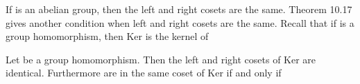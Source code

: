 \documentclass[11pt,oneside]{article}
\begin{document}
\begin{BookBody}
If  is an abelian group, then the left and right cosets are the same. Theorem 10.17 gives another condition when left and right cosets are the same. Recall that if   is a group homomorphism, then Ker is the kernel of 

 Let  be a group homomorphism. Then the left and right cosets of Ker\BookInline{(\phi )} are identical. Furthermore are in the same coset of Ker\BookInline{(\phi )} if and only if 

\end{BookBody}

\BookNarrativetrue
\end{document}
